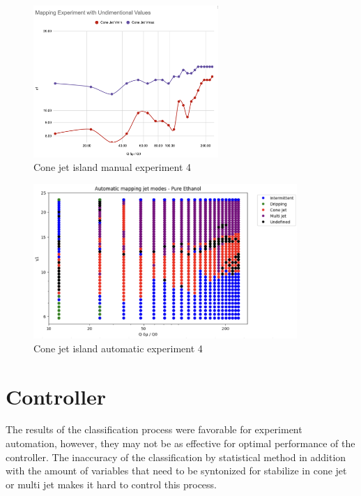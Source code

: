     \begin{multicols}{2}

        \begin{figure}[H]
            \center
            \includegraphics[width=7cm]{Figuras/april/manual_non_dim_exp.png}
            \caption{Cone jet island manual experiment 4}
            \label{fig:stability_8}
        \end{figure}

        \begin{figure}[H]
            \center
            \includegraphics[width=10cm]{Figuras/19:03/non-dimensional-1.png}
            \caption{Cone jet island automatic experiment 4}
            \label{fig:stability_9}
        \end{figure}


    \end{multicols}

\section{Controller}
\label{sec:controller_results}

    The results of the classification process were favorable for experiment automation, however, they may not be as effective for optimal performance of the controller.
    The inaccuracy of the classification by statistical method in addition with the amount of variables that need to be syntonized for stabilize in cone jet or multi jet makes it hard to control this process.

